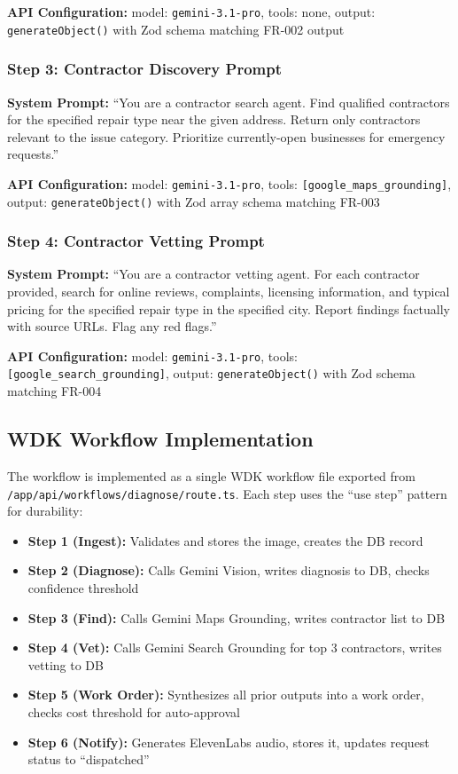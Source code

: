 \documentclass[12pt,a4paper]{article}
\begin{document}
\textbf{API Configuration:} model: \texttt{gemini-3.1-pro}, tools: none, output: \texttt{generateObject()} with Zod schema matching FR-002 output

\subsubsection{Step 3: Contractor Discovery Prompt}

\textbf{System Prompt:} ``You are a contractor search agent. Find qualified contractors for the specified repair type near the given address. Return only contractors relevant to the issue category. Prioritize currently-open businesses for emergency requests.''

\textbf{API Configuration:} model: \texttt{gemini-3.1-pro}, tools: \texttt{[google\_maps\_grounding]}, output: \texttt{generateObject()} with Zod array schema matching FR-003

\subsubsection{Step 4: Contractor Vetting Prompt}

\textbf{System Prompt:} ``You are a contractor vetting agent. For each contractor provided, search for online reviews, complaints, licensing information, and typical pricing for the specified repair type in the specified city. Report findings factually with source URLs. Flag any red flags.''

\textbf{API Configuration:} model: \texttt{gemini-3.1-pro}, tools: \texttt{[google\_search\_grounding]}, output: \texttt{generateObject()} with Zod schema matching FR-004

\subsection{WDK Workflow Implementation}

The workflow is implemented as a single WDK workflow file exported from \texttt{/app/api/workflows/diagnose/route.ts}. Each step uses the ``use step'' pattern for durability:

\begin{itemize}
    \item \textbf{Step 1 (Ingest):} Validates and stores the image, creates the DB record
    \item \textbf{Step 2 (Diagnose):} Calls Gemini Vision, writes diagnosis to DB, checks confidence threshold
    \item \textbf{Step 3 (Find):} Calls Gemini Maps Grounding, writes contractor list to DB
    \item \textbf{Step 4 (Vet):} Calls Gemini Search Grounding for top 3 contractors, writes vetting to DB
    \item \textbf{Step 5 (Work Order):} Synthesizes all prior outputs into a work order, checks cost threshold for auto-approval
    \item \textbf{Step 6 (Notify):} Generates ElevenLabs audio, stores it, updates request status to ``dispatched''
\end{itemize}
\end{document}
